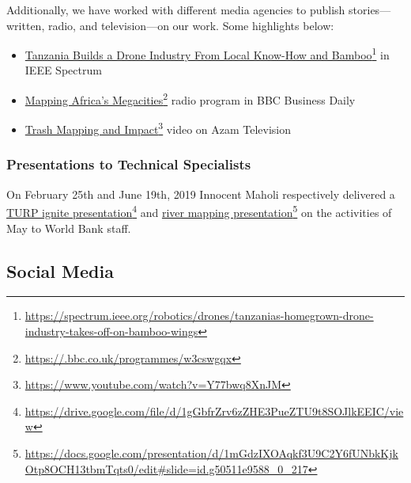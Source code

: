 \documentclass[a4paper,12pt,twoside]{article}
\begin{document}
Additionally, we have worked with different media agencies to publish stories---written, radio, and television---on our work. Some highlights below:

\begin{itemize}
	\item \href{https://spectrum.ieee.org/robotics/drones/tanzanias-homegrown-drone-industry-takes-off-on-bamboo-wings}{Tanzania Builds a Drone Industry From Local Know-How and Bamboo}\footnote{\url{https://spectrum.ieee.org/robotics/drones/tanzanias-homegrown-drone-industry-takes-off-on-bamboo-wings}} in IEEE Spectrum
	
	\item \href{https://.bbc.co.uk/programmes/w3cswgqx}{Mapping Africa’s Megacities}\footnote{\url{https://.bbc.co.uk/programmes/w3cswgqx}} radio program in BBC Business Daily
	
	\item \href{https://www.youtube.com/watch?v=Y77bwq8XnJM}{Trash Mapping and Impact}\footnote{\url{https://www.youtube.com/watch?v=Y77bwq8XnJM}} video on Azam Television
\end{itemize}

\subsubsection{Presentations to Technical Specialists} 
On February 25th and June 19th, 2019 Innocent Maholi respectively delivered a \href{https://drive.google.com/file/d/1gGbfrZrv6zZHE3PueZTU9t8SOJlkEEIC/view}{TURP ignite presentation}\footnote{\url{https://drive.google.com/file/d/1gGbfrZrv6zZHE3PueZTU9t8SOJlkEEIC/view}} and \href{https://docs.google.com/presentation/d/1mGdzIXOAqkf3U9C2Y6fUNbkKjkOtp8OCH13tbmTqts0/edit#slide=id.g50511e9588_0_217}{river mapping presentation}\footnote{\url{https://docs.google.com/presentation/d/1mGdzIXOAqkf3U9C2Y6fUNbkKjkOtp8OCH13tbmTqts0/edit#slide=id.g50511e9588_0_217}} on the activities of May to World Bank staff. 

\newpage
\subsection{Social Media}
\end{document}
